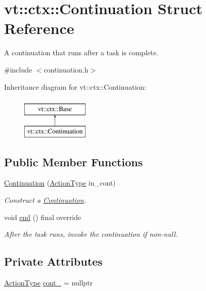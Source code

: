\hypertarget{structvt_1_1ctx_1_1_continuation}{}\section{vt\+:\+:ctx\+:\+:Continuation Struct Reference}
\label{structvt_1_1ctx_1_1_continuation}


A continuation that runs after a task is complete.  




{\ttfamily \#include $<$continuation.\+h$>$}

Inheritance diagram for vt\+:\+:ctx\+:\+:Continuation\+:\begin{figure}[H]
\begin{center}
\leavevmode
\includegraphics[height=2.000000cm]{structvt_1_1ctx_1_1_continuation}
\end{center}
\end{figure}
\subsection*{Public Member Functions}
\begin{DoxyCompactItemize}
\item 
\hyperlink{structvt_1_1ctx_1_1_continuation_ad18f8613f142fa3ed0e08f9d8df4e05a}{Continuation} (\hyperlink{namespacevt_ae0a5a7b18cc99d7b732cb4d44f46b0f3}{Action\+Type} in\+\_\+cont)
\begin{DoxyCompactList}\small\item\em Construct a {\ttfamily \hyperlink{structvt_1_1ctx_1_1_continuation}{Continuation}}. \end{DoxyCompactList}\item 
void \hyperlink{structvt_1_1ctx_1_1_continuation_aab0f231b54f257740a902a6b3258a33a}{end} () final override
\begin{DoxyCompactList}\small\item\em After the task runs, invoke the continuation if non-\/null. \end{DoxyCompactList}\end{DoxyCompactItemize}
\subsection*{Private Attributes}
\begin{DoxyCompactItemize}
\item 
\hyperlink{namespacevt_ae0a5a7b18cc99d7b732cb4d44f46b0f3}{Action\+Type} \hyperlink{structvt_1_1ctx_1_1_continuation_aadaa0a147af8e8bba30684a098a5eb39}{cont\+\_\+} = nullptr
\end{DoxyCompactItemize}


